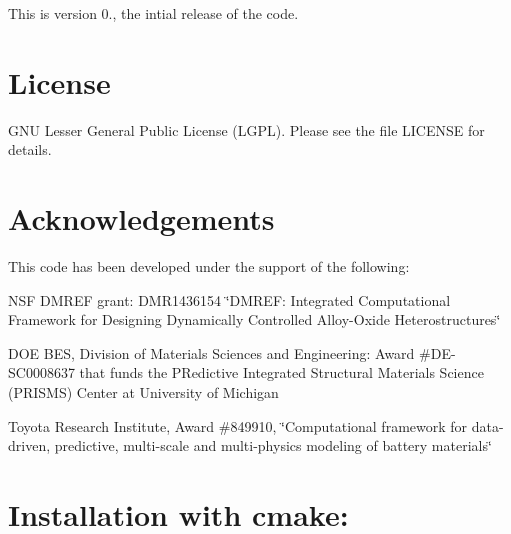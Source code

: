 This is version 0., the intial release of the code.

\section*{{\bfseries{License}}~\newline
 }

G\+NU Lesser General Public License (L\+G\+PL). Please see the file L\+I\+C\+E\+N\+SE for details.

\section*{{\bfseries{Acknowledgements}}~\newline
 }

This code has been developed under the support of the following\+: ~\newline



\begin{DoxyItemize}
\item N\+SF D\+M\+R\+EF grant\+: D\+M\+R1436154 \char`\"{}\+D\+M\+R\+E\+F\+: Integrated Computational Framework for Designing Dynamically Controlled Alloy-\/\+Oxide Heterostructures\char`\"{} ~\newline

\item D\+OE B\+ES, Division of Materials Sciences and Engineering\+: Award \#\+DE-\/S\+C0008637 that funds the P\+Redictive Integrated Structural Materials Science (P\+R\+I\+S\+MS) Center at University of Michigan ~\newline

\item Toyota Research Institute, Award \#849910, \char`\"{}\+Computational framework for data-\/driven, predictive, multi-\/scale and multi-\/physics modeling of battery materials\char`\"{} ~\newline

\end{DoxyItemize}

\section*{{\bfseries{Installation with cmake\+:}}~\newline
 }


